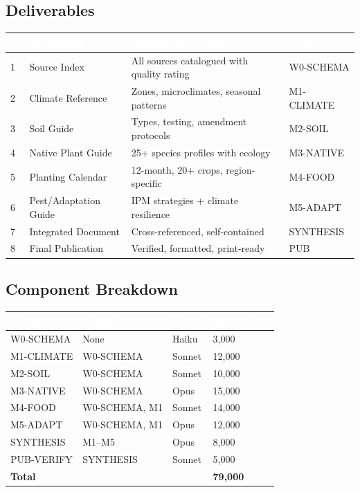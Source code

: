 \documentclass[11pt,letterpaper]{article}
\newcommand{\tableheader}[1]{\textbf{\sffamily\textcolor{white}{#1}}}
\begin{document}
\subsection{Deliverables}

\begin{center}
\begin{tabularx}{\textwidth}{C{0.5cm}L{3.5cm}XC{2cm}}
\toprule
{}
\tableheader{\#} & \tableheader{Deliverable} & \tableheader{Acceptance Criteria} & \tableheader{Spec} \\
 & Source Index & All sources catalogued with quality rating & W0-SCHEMA \\
2 & Climate Reference & Zones, microclimates, seasonal patterns & M1-CLIMATE \\
3 & Soil Guide & Types, testing, amendment protocols & M2-SOIL \\
4 & Native Plant Guide & 25+ species profiles with ecology & M3-NATIVE \\
5 & Planting Calendar & 12-month, 20+ crops, region-specific & M4-FOOD \\
6 & Pest/Adaptation Guide & IPM strategies + climate resilience & M5-ADAPT \\
7 & Integrated Document & Cross-referenced, self-contained & SYNTHESIS \\
8 & Final Publication & Verified, formatted, print-ready & PUB \\
\bottomrule
\end{tabularx}
\end{center}

\subsection{Component Breakdown}

\begin{center}
\begin{tabularx}{\textwidth}{L{3cm}L{2.5cm}C{1.5cm}C{2cm}}
\toprule
{}
\tableheader{Component} & \tableheader{Dependencies} & \tableheader{Model} & \tableheader{Est. Tokens} \\
\midrule
W0-SCHEMA & None & Haiku & 3,000 \\
M1-CLIMATE & W0-SCHEMA & Sonnet & 12,000 \\
M2-SOIL & W0-SCHEMA & Sonnet & 10,000 \\
M3-NATIVE & W0-SCHEMA & Opus & 15,000 \\
M4-FOOD & W0-SCHEMA, M1 & Sonnet & 14,000 \\
M5-ADAPT & W0-SCHEMA, M1 & Opus & 12,000 \\
SYNTHESIS & M1--M5 & Opus & 8,000 \\
PUB-VERIFY & SYNTHESIS & Sonnet & 5,000 \\
\midrule
\textbf{Total} & & & \textbf{79,000} \\
\bottomrule
\end{tabularx}
\end{center}
\end{document}
